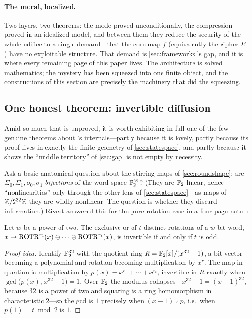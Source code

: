 \paragraph{The moral, localized.} Two layers, two theorems: the mode
proved unconditionally, the compression proved in an idealized model, and
between them they reduce the security of the whole edifice to a single
demand---that the core map $f$ (equivalently the cipher $E$) have no
exploitable structure. That demand is \cref{sec:frameworks}'s gap, and
it is where every remaining page of this paper lives. The architecture is
solved mathematics; the mystery has been squeezed into one finite object,
and the constructions of this section are precisely the machinery that
did the squeezing.

\subsection{One honest theorem: invertible diffusion}\label{sec:rivest}

Amid so much that is unproved, it is worth exhibiting in full one of the
few genuine theorems about \SHA{}'s internals---partly because it is
lovely, partly because its proof lives in exactly the finite geometry of
\cref{sec:statespace}, and partly because it shows the ``middle
territory'' of \cref{sec:gap} is not empty by necessity.

Ask a basic anatomical question about the stirring maps of
\cref{sec:roundshape}: are $\Sigma_0, \Sigma_1, \sigma_0, \sigma_1$
\emph{bijections} of the word space $\mathbb{F}_2^{32}$? (They are
$\mathbb{F}_2$-linear, hence ``nonlinearities'' only through the other lens of
\cref{sec:statespace}---as maps of $\mathbb{Z}/2^{32}\mathbb{Z}$ they are wildly nonlinear.
The question is whether they discard information.) Rivest answered this
for the pure-rotation case in a four-page note~\citep{Rivest2011}:

\begin{theorem}[Rivest]\label{thm:rivest}
Let $w$ be a power of two. The exclusive-or of $t$ distinct rotations of
a $w$-bit word,
$x \mapsto \mathrm{ROTR}^{r_1}(x) \oplus \cdots \oplus \mathrm{ROTR}^{r_t}(x)$,
is invertible if and only if $t$ is odd.
\end{theorem}

\begin{proof}[Proof idea]
Identify $\mathbb{F}_2^{32}$ with the quotient ring
$R = \mathbb{F}_2[x]/(x^{32}-1)$, a bit vector becoming a polynomial and
rotation becoming multiplication by $x^{r}$. The map in question is
multiplication by $p(x) = x^{r_1} + \cdots + x^{r_t}$, invertible in $R$
exactly when $\gcd\bigl(p(x),\, x^{32}-1\bigr) = 1$. Over $\mathbb{F}_2$ the
modulus collapses---$x^{32} - 1 = (x-1)^{32}$, because $32$ is a power of
two and squaring is a ring homomorphism in characteristic $2$---so the
gcd is $1$ precisely when $(x-1) \nmid p$, i.e.\ when $p(1) = t \bmod 2$
is $1$.
\end{proof}

